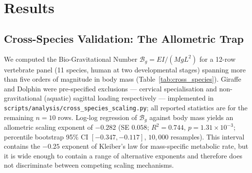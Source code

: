 \section{Results}

\subsection{Cross-Species Validation: The Allometric Trap}

We computed the Bio-Gravitational Number $\mathcal{B}_g = EI/(MgL^2)$ for a 12-row vertebrate panel (11 species, human at two developmental stages) spanning more than five orders of magnitude in body mass (Table~\ref{tab:cross_species}). Giraffe and Dolphin were pre-specified exclusions --- cervical specialisation and non-gravitational (aquatic) sagittal loading respectively --- implemented in \texttt{scripts/analysis/cross\_species\_scaling.py}; all reported statistics are for the remaining $n=10$ rows. Log-log regression of $\mathcal{B}_g$ against body mass yields an allometric scaling exponent of $-0.282$ (SE $0.058$; $R^2 = 0.744$, $p = 1.31 \times 10^{-3}$; percentile bootstrap 95\% CI $[-0.347, -0.117]$, $10{,}000$ resamples). This interval contains the $-0.25$ exponent of Kleiber's law for mass-specific metabolic rate, but it is wide enough to contain a range of alternative exponents and therefore does not discriminate between competing scaling mechanisms.

